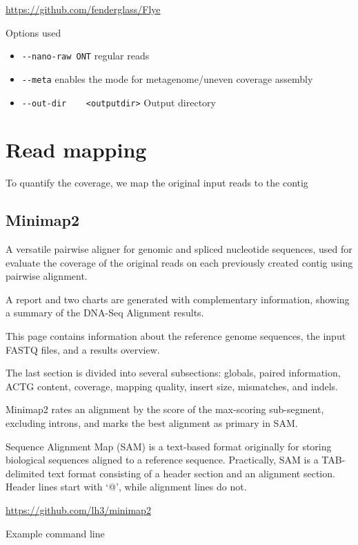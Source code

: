 \documentclass[
]{book}
\providecommand{\tightlist}{%
  \setlength{\itemsep}{0pt}\setlength{\parskip}{0pt}}
\begin{document}
\url{https://github.com/fenderglass/Flye}

Options used

\begin{itemize}
\tightlist
\item
  \texttt{-\/-nano-raw\ ONT} regular reads
\item
  \texttt{-\/-meta} enables the mode for metagenome/uneven coverage assembly
\item
  \texttt{-\/-out-dir\ \ \ \ \textless{}outputdir\textgreater{}} Output directory
\end{itemize}

\section{Read mapping}\label{read-mapping}

To quantify the coverage, we map the original input reads to the contig

\subsection{Minimap2}\label{minimap2}

A versatile pairwise aligner for genomic and spliced nucleotide sequences, used for evaluate the coverage of the original reads on each previously created contig using pairwise alignment.

A report and two charts are generated with complementary information, showing a summary of the DNA-Seq Alignment results.

This page contains information about the reference genome sequences, the input FASTQ files, and a results overview.

The last section is divided into several subsections: globals, paired information, ACTG content, coverage, mapping quality, insert size, mismatches, and indels.

Minimap2 rates an alignment by the score of the max-scoring sub-segment, excluding introns, and marks the best alignment as primary in SAM.

Sequence Alignment Map (SAM) is a text-based format originally for storing biological sequences aligned to a reference sequence.
Practically, SAM is a TAB-delimited text format consisting of a header section and an alignment section.
Header lines start with `@', while alignment lines do not.

\url{https://github.com/lh3/minimap2}

Example command line
\end{document}
